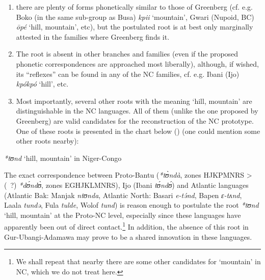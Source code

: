 \begin{enumerate}
\item there are plenty of forms phonetically similar to those of Greenberg (cf. e.g. Boko (in the same sub-group as Busa) \textit{kpii} ‘mountain’, Gwari (Nupoid, BC) \textit{{\={o}}p{\'{e}}} ‘hill, mountain’, etc), but the postulated root is at best only marginally attested in the families where Greenberg finds it. 
\item The root is absent in other branches and families (even if the proposed phonetic correspondences are approached most liberally), although, if wished, its “reflexes” can be found in any of the NC families, cf. e.g. Ibani (Ijo) \textit{kp{\'{o}}kp{\'{o}}} ‘hill’, etc. 
\item Most importantly, several other roots with the meaning ‘hill, mountain’ are distinguishable in the NC languages. All of them (unlike the one proposed by Greenberg) are valid candidates for the reconstruction of the NC prototype. One of these roots is presented in the chart below () (one could mention some other roots nearby):
\end{enumerate}


\begin{table}
\caption{\textit{*tʊnd} ‘hill, mountain’ in Niger-Congo} 
\label{tab:0.4}

\end{table}

The exact correspondence between Proto-Bantu (\textit{*t{\`{ʊ}}ndà}, zones HJKPMNRS > (~?) \textit{*d{\'{ʊ}}nd{\`{ʊ}}},  zones EGHJKLMNRS), Ijo (Ibani \textit{t{\'{ʊ}}nd{\'{ʊ}}}) and Atlantic languages (Atlantic Bak: Manjak \textit{ntʊnda}, Atlantic North: Basari \textit{e-t{\'{ə}}nd}, Bapen \textit{ɛ{}-tʌnd}, Laala \textit{tundə}, Fula \textit{tulde}, Wolof \textit{tund}) is reason enough to postulate the root \textit{*tʊnd} ‘hill, mountain’ at the Proto-NC level, especially since these languages have apparently been out of direct contact.\footnote{We shall repeat that nearby there are some other candidates for ‘mountain’ in NC, which we do not treat here.} In addition, the absence of this root in Gur{}-Ubangi{}-Adamawa may prove to be a shared innovation in these languages.

